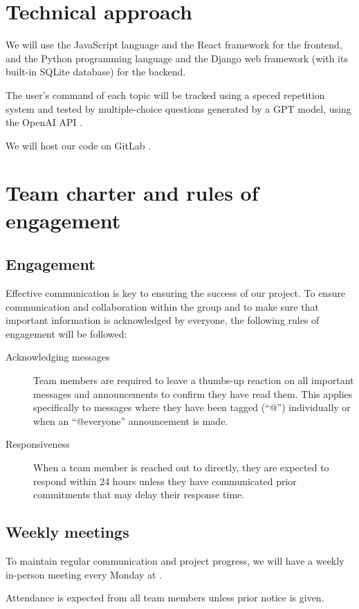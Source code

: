 \documentclass{scrartcl}
\begin{document}
\section{Technical approach}
We will use the JavaScript language \parencite{javascript} and the React framework \parencite{react} for the frontend, and the Python programming language and the Django\label{sec:tech} web framework \parencite{django} (with its built-in SQLite \parencite{sqlite} database) for the backend.

\par
The user's command of each topic will be tracked using a speced repetition system  and tested by multiple-choice questions generated by a GPT model, using the OpenAI API \parencite{openai-api}.

\par
We will host our code on GitLab \parencite{gitlab}.

\section{Team charter and rules of engagement}
\subsection{Engagement}
Effective communication is key to ensuring the success of our project.
To ensure communication and collaboration within the group and to make sure that important information is acknowledged by everyone, the following rules of engagement will be followed:

\begin{description}
\item[Acknowledging messages]Team members are required to leave a thumbs-up reaction on all important messages and announcements to confirm they have read them. This applies specifically to messages where they have been tagged (``@'') individually or when an ``@everyone'' announcement is made.
\item[Responsiveness]When a team member is reached out to directly, they are expected to respond within  24 hours  unless they have communicated prior commitments that may delay their response time.
\end{description}

\subsection{Weekly meetings}
To maintain regular communication and project progress, we will have a weekly in-person meeting every Monday at .
\par
Attendance is expected from all team members unless prior notice is given.
\end{document}
